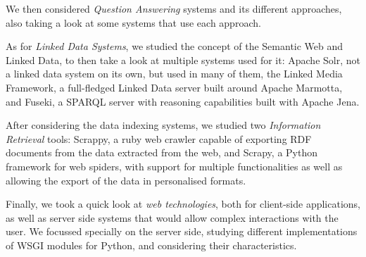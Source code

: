 We then considered \emph{Question Answering} systems and its different approaches, also taking a look at some systems that use each approach.

As for \emph{Linked Data Systems}, we studied the concept of the Semantic Web and Linked Data, to then take a look at multiple systems used for it: Apache Solr, not a linked data system on its own, but used in many of them, the Linked Media Framework, a full-fledged Linked Data server built around Apache Marmotta, and Fuseki, a \ac{SPARQL} server with reasoning capabilities built with Apache Jena.

After considering the data indexing systems, we studied two \emph{Information Retrieval} tools: Scrappy, a ruby web crawler capable of exporting \ac{RDF} documents from the data extracted from the web, and Scrapy, a Python framework for web spiders, with support for multiple functionalities as well as allowing the export of the data in personalised formats.

Finally, we took a quick look at \emph{web technologies}, both for client-side applications, as well as server side systems that would allow complex interactions with the user. We focussed specially on the server side, studying different implementations of WSGI modules for Python, and considering their characteristics.
